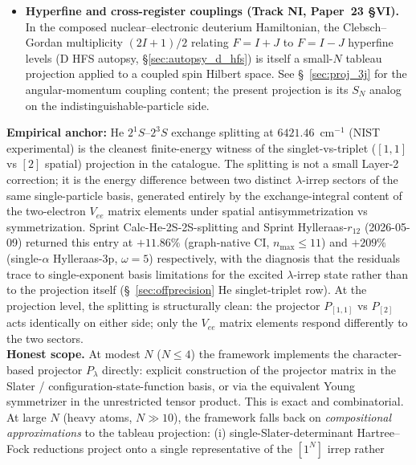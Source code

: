 \begin{itemize}
specific tableau patterns under the periodic-table indexing of
Paper~16 §\ref{sec:sn_irreps}.  The classifier is the boundary at
which the $S_N$ projection becomes computationally explicit in the
production composed-Hamiltonian pipeline.
\item \textbf{Hyperfine and cross-register couplings (Track NI,
Paper~23 §VI).}  In the composed nuclear--electronic deuterium
Hamiltonian, the Clebsch--Gordan multiplicity $(2I+1)/2$ relating
$F = I+J$ to $F = I-J$ hyperfine levels (D HFS autopsy,
\S\ref{sec:autopsy_d_hfs}) is itself a small-$N$ tableau projection
applied to a coupled spin Hilbert space.  See \S~\ref{sec:proj_3j}
for the angular-momentum coupling content; the present projection
is its $S_N$ analog on the indistinguishable-particle side.
\end{itemize}
\textbf{Empirical anchor:} He $2^1 S$--$2^3 S$ exchange splitting at
$6421.46$~cm$^{-1}$ (NIST experimental) is the cleanest finite-energy
witness of the singlet-vs-triplet ($[1,1]$ vs $[2]$ spatial)
projection in the catalogue.  The splitting is not a small Layer-2
correction; it is the energy difference between two distinct
$\lambda$-irrep sectors of the same single-particle basis, generated
entirely by the exchange-integral content of the two-electron $V_{ee}$
matrix elements under spatial antisymmetrization vs symmetrization.
Sprint Calc-He-2S-2S-splitting and Sprint Hylleraas-$r_{12}$
(2026-05-09) returned this entry at $+11.86\%$ (graph-native CI,
$n_{\max} \leq 11$) and $+209\%$ (single-$\alpha$ Hylleraas-3p,
$\omega = 5$) respectively, with the diagnosis that the residuals
trace to single-exponent basis limitations for the excited
$\lambda$-irrep state rather than to the projection itself
(\S~\ref{sec:offprecision} He singlet-triplet row).  At the
projection level, the splitting is structurally clean: the projector
$P_{[1,1]}$ vs $P_{[2]}$ acts identically on either side; only the
$V_{ee}$ matrix elements respond differently to the two sectors.\\
\textbf{Honest scope.}  At modest $N$ ($N \leq 4$) the framework
implements the character-based projector $P_\lambda$ directly:
explicit construction of the projector matrix in the Slater /
configuration-state-function basis, or via the equivalent Young
symmetrizer in the unrestricted tensor product.  This is exact and
combinatorial.  At large $N$ (heavy atoms, $N \gg 10$), the framework
falls back on \emph{compositional approximations} to the tableau
projection: (i) single-Slater-determinant Hartree--Fock reductions
project onto a single representative of the $[1^N]$ irrep rather

